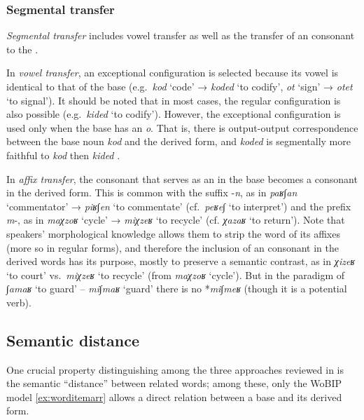 \documentclass[output=paper,
modfonts
]{LSP/langsci}
\begin{document}
\subsubsection{Segmental transfer}\label{sec:batel:3.1.2}
\emph{Segmental transfer} includes vowel transfer as well as the
transfer of an  consonant to the  \citep{Batel1994}.

In \emph{vowel transfer}, an exceptional configuration is selected
because its vowel is identical to that of the base (e.g.\ \emph{kod}
`code' → \emph{koded} `to codify', \emph{ot} `sign' → \emph{otet} `to
signal'). It should be noted that in most cases, the regular
configuration is also possible (e.g.\ \emph{kided} `to codify'). However,
the exceptional configuration is used only when the base has an
\emph{o}. That is, there is output-output correspondence between the
base noun \emph{kod} and the derived form, and \emph{koded} is
segmentally more faithful to \emph{kod} then \emph{kided} \citep{batel2003a}.

In \emph{affix transfer}, the consonant that serves as an  in the
base becomes a  consonant in the derived form. This is common with
the suffix -\emph{n}, as in \emph{paʁ∫an} `commentator' → \emph{piʁ∫en}
`to commentate' (cf.\ \emph{peʁe∫} `to interpret') and the prefix
\emph{m}-, as in \emph{maχzoʁ} `cycle' → \emph{miχzeʁ} `to recycle' (cf.
\emph{χazaʁ} `to return'). Note that speakers' morphological knowledge
allows them to strip the word of its affixes (more so in regular forms),
and therefore the inclusion of an  consonant in the derived words
has its purpose, mostly to preserve a semantic contrast, as in
\emph{χizeʁ} `to court' vs.\ \emph{miχzeʁ} `to recycle' (from
\emph{maχzoʁ} `cycle'). But in the paradigm of \emph{∫amaʁ} `to guard'
-- \emph{mi∫maʁ} `guard' there is no *\emph{mi∫meʁ} (though it is a
potential verb).

\subsection{Semantic distance} 

One crucial property distinguishing among the three approaches reviewed in  is the
semantic ``distance'' between related words; among these, only the WoBIP model \cref{ex:worditemarr} allows a 
direct relation between a base and its derived form.
\end{document}
